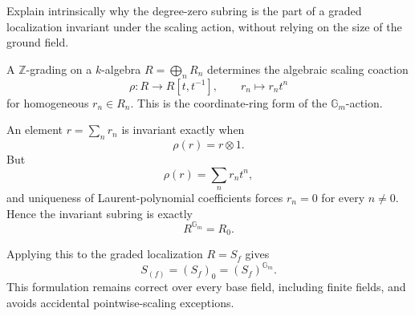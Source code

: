 \begin{problem}\label{prob:vi34-20}
Explain intrinsically why the degree-zero subring is the part of a graded localization invariant under the scaling
action, without relying on the size of the ground field.

\end{problem}

\ifdefined\FullProblemDossiers
\begin{solution}
A \(\mathbb Z\)-grading on a \(k\)-algebra \(R=\bigoplus_nR_n\) determines the algebraic scaling coaction
\[
\rho:R\longrightarrow R[t,t^{-1}],
\qquad
r_n\longmapsto r_nt^n
\]
for homogeneous \(r_n\in R_n\). This is the coordinate-ring form of the \(\mathbb G_m\)-action.

An element \(r=\sum_nr_n\) is invariant exactly when
\[
\rho(r)=r\otimes1.
\]
But
\[
\rho(r)=\sum_nr_nt^n,
\]
and uniqueness of Laurent-polynomial coefficients forces \(r_n=0\) for every \(n\neq0\). Hence the invariant
subring is exactly
\[
\boxed{R^{\mathbb G_m}=R_0}.
\]

Applying this to the graded localization \(R=S_f\) gives
\[
\boxed{S_{(f)}=(S_f)_0=(S_f)^{\mathbb G_m}}.
\]
This formulation remains correct over every base field, including finite fields, and avoids accidental
pointwise-scaling exceptions.
\end{solution}
\fi
